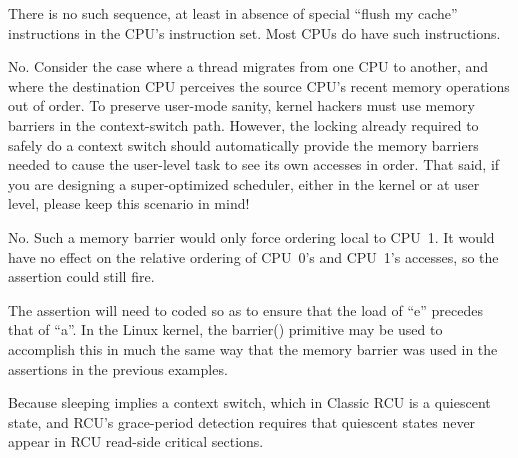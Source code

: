 
	There is no such sequence, at least in absence of special
	``flush my cache'' instructions in the CPU's instruction set.
	Most CPUs do have such instructions.


	No.  Consider the case where a thread migrates from one CPU to
	another, and where the destination CPU perceives the source
	CPU's recent memory operations out of order.  To preserve
	user-mode sanity, kernel hackers must use memory barriers in
	the context-switch path.  However, the locking already required
	to safely do a context switch should automatically provide
	the memory barriers needed to cause the user-level task to see
	its own accesses in order.  That said, if you are designing a
	super-optimized scheduler, either in the kernel or at user level,
	please keep this scenario in mind!


No.  Such a memory barrier would only force ordering local to CPU~1.
It would have no effect on the relative ordering of CPU~0's and
CPU~1's accesses, so the assertion could still fire.


The assertion will need to coded so as to ensure that the load of
``e'' precedes that of ``a''.
In the Linux kernel, the barrier() primitive may be used to accomplish
this in much the same way that the memory barrier was used in the
assertions in the previous examples.


Because sleeping implies a context switch, which in Classic RCU is
a quiescent state, and RCU's grace-period detection requires that
quiescent states never appear in RCU read-side critical sections.

